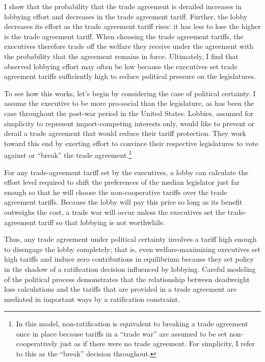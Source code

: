 \documentclass[10pt]{article}
\begin{document}
I show that the probability that the trade agreement is derailed increases in lobbying effort and decreases in the trade agreement tariff. Further, the lobby decreases its effort as the trade agreement tariff rises: it has less to lose the higher is the trade agreement tariff. When choosing the trade agreement tariffs, the executives therefore trade off the welfare they receive under the agreement with the probability that the agreement remains in force. Ultimately, I find that observed lobbying effort may often be low because the executives set trade agreement tariffs sufficiently high to reduce political pressure on the legislatures.

To see how this works, let's begin by considering the case of political certainty. I assume the executive to be more pro-social than the legislature, as has been the case throughout the post-war period in the United States. Lobbies, assumed for simplicity to represent import-competing interests only, would like to prevent or derail a trade agreement that would reduce their tariff protection. They work toward this end by exerting effort to convince their respective legislatures to vote against or ``break'' the trade agreement.\footnote{In this model, non-ratification is equivalent to breaking a trade agreement once in place because tariffs in a ``trade war'' are assumed to be set non-cooperatively just as if there were no trade agreement. For simplicity, I refer to this as the ``break'' decision throughout.}

For any trade-agreement tariff set by the executives, a lobby can calculate the effort level required to shift the preferences of the median legislator just far enough so that he will choose the non-cooperative tariffs over the trade agreement tariffs. Because the lobby will pay this price so long as its benefit outweighs the cost, a trade war will occur unless the executives set the trade-agreement tariff so that lobbying is not worthwhile.

Thus, any trade agreement under political certainty involves a tariff high enough to disengage the lobby completely; that is, even welfare-maximizing executives set high tariffs and induce zero contributions in equilibrium because they set policy in the shadow of a ratification decision influenced by lobbying. Careful modeling of the political process demonstrates that the relationship between deadweight loss calculations and the tariffs that are provided in a trade agreement are mediated in important ways by a ratification constraint.
\end{document}
